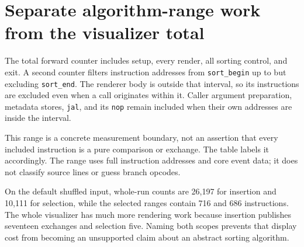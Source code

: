 \section{Separate algorithm-range work from the visualizer
  total}\label{009-sorting-visualizer-p10-separate-algorithm-range-work-from-the-visualizer-total}

The total forward counter includes setup, every render, all sorting
control, and exit. A second counter filters instruction addresses from
\texttt{sort\_begin} up to but excluding \texttt{sort\_end}. The
renderer body is outside that interval, so its instructions are excluded
even when a call originates within it. Caller argument preparation,
metadata stores, \texttt{jal}, and its \texttt{nop} remain included when
their own addresses are inside the interval.

This range is a concrete measurement boundary, not an assertion that
every included instruction is a pure comparison or exchange. The table
labels it accordingly. The range uses full instruction addresses and
core event data; it does not classify source lines or guess branch
opcodes.

On the default shuffled input, whole-run counts are 26,197 for insertion
and 10,111 for selection, while the selected ranges contain 716 and 686
instructions. The whole visualizer has much more rendering work because
insertion publishes seventeen exchanges and selection five. Naming both
scopes prevents that display cost from becoming an unsupported claim
about an abstract sorting algorithm.
